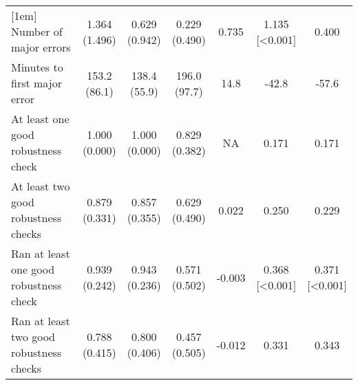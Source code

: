 \begin{table}[ht]
{\begin{tabular}{lcccccc}
[1em]
Number of major errors & \shortstack{1.364\\(1.496)} & \shortstack{0.629\\(0.942)} & \shortstack{0.229\\(0.490)} & \shortstack{0.735\\[0.017]} & \shortstack{1.135\\[\textless0.001]} & \shortstack{0.400\\[0.029]}\\
[1em]
Minutes to first major error & \shortstack{153.2\\(86.1)} & \shortstack{138.4\\(55.9)} & \shortstack{196.0\\(97.7)} & \shortstack{14.8\\[0.577]} & \shortstack{-42.8\\[0.284]} & \shortstack{-57.6\\[0.099]}\\
[1em]
At least one good robustness check & \shortstack{1.000\\(0.000)} & \shortstack{1.000\\(0.000)} & \shortstack{0.829\\(0.382)} & \shortstack{NA\\[NA]} & \shortstack{0.171\\[0.012]} & \shortstack{0.171\\[0.010]}\\
[1em]
At least two good robustness checks & \shortstack{0.879\\(0.331)} & \shortstack{0.857\\(0.355)} & \shortstack{0.629\\(0.490)} & \shortstack{0.022\\[0.796]} & \shortstack{0.250\\[0.017]} & \shortstack{0.229\\[0.029]}\\
[1em]
Ran at least one good robustness check & \shortstack{0.939\\(0.242)} & \shortstack{0.943\\(0.236)} & \shortstack{0.571\\(0.502)} & \shortstack{-0.003\\[0.953]} & \shortstack{0.368\\[\textless0.001]} & \shortstack{0.371\\[\textless0.001]}\\
[1em]
Ran at least two good robustness checks & \shortstack{0.788\\(0.415)} & \shortstack{0.800\\(0.406)} & \shortstack{0.457\\(0.505)} & \shortstack{-0.012\\[0.903]} & \shortstack{0.331\\[0.005]} & \shortstack{0.343\\[0.003]}\\

\end{tabular}}
\end{table}
